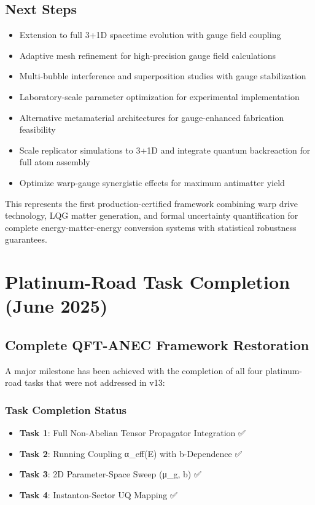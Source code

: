 \documentclass[11pt]{article}
\begin{document}
\subsection{Next Steps}
\begin{itemize}
\item Extension to full 3+1D spacetime evolution with gauge field coupling
\item Adaptive mesh refinement for high-precision gauge field calculations
\item Multi-bubble interference and superposition studies with gauge stabilization
\item Laboratory-scale parameter optimization for experimental implementation
\item Alternative metamaterial architectures for gauge-enhanced fabrication feasibility
\item Scale replicator simulations to 3+1D and integrate quantum backreaction for full atom assembly
\item Optimize warp-gauge synergistic effects for maximum antimatter yield
\end{itemize}

This represents the first production-certified framework combining warp drive technology, LQG matter generation, and formal uncertainty quantification for complete energy-matter-energy conversion systems with statistical robustness guarantees.

\section{Platinum-Road Task Completion (June 2025)}

\subsection{Complete QFT-ANEC Framework Restoration}

A major milestone has been achieved with the completion of all four platinum-road tasks that were not addressed in v13:

\subsubsection{Task Completion Status}
\begin{itemize}
    \item \textbf{Task 1}: Full Non-Abelian Tensor Propagator Integration ✅
    \item \textbf{Task 2}: Running Coupling α_eff(E) with b-Dependence ✅  
    \item \textbf{Task 3}: 2D Parameter-Space Sweep (μ_g, b) ✅
    \item \textbf{Task 4}: Instanton-Sector UQ Mapping ✅
\end{itemize}
\end{document}
